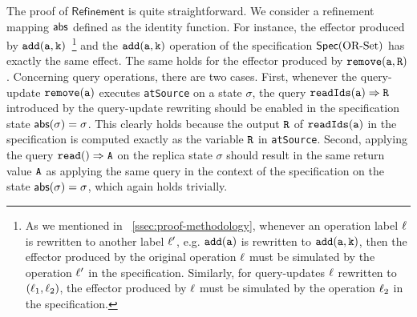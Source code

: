 The proof of $\mathsf{Refinement}$ is quite straightforward. We consider a refinement mapping $\mathsf{abs}$ defined as the identity function. For instance, the effector produced by $\alabelshort[{\tt add}]{a,k}$~\footnote{As we mentioned in \sectionautorefname~\ref{ssec:proof-methodology}, whenever an operation label $\ell$ is rewritten to another label $\ell'$, e.g. $\alabelshort[{\tt add}]{a}$ is rewritten to $\alabelshort[{\tt add}]{a,k}$, then the effector produced by the original operation $\ell$ must be simulated by the operation $\ell'$ in the specification. Similarly, for query-updates $\ell$ rewritten to $(\ell_1,\ell_2)$, the effector produced by $\ell$ must be simulated by the operation $\ell_2$ in the specification.} and the $\alabelshort[{\tt add}]{a,k}$ operation of the specification $\mathsf{Spec}(\text{OR\text{-}Set})$ has exactly the same effect. The same holds for the effector produced by $\alabelshort[{\tt remove}]{a,R}$. Concerning query operations, there are two cases. First, whenever the query-update $\alabelshort[{\tt remove}]{a}$ executes \lstinline|atSource| on a state $\sigma$, the query $\alabellong[{\tt readIds}]{a}{R}{}$ introduced by the query-update rewriting should be enabled in the specification state $\mathsf{abs}(\sigma)=\sigma$. This clearly holds because the output ${\tt R}$ of ${\tt readIds(a)}$ in the specification is computed exactly as the variable ${\tt R}$ in \lstinline|atSource|.
Second, applying the query $\alabellongind[{\tt read}]{}{A}{}$ on the replica state $\sigma$ should result in the same return value ${\tt A}$ as applying the same query in the context of the specification on the state $\mathsf{abs}(\sigma)=\sigma$, which again holds trivially.

